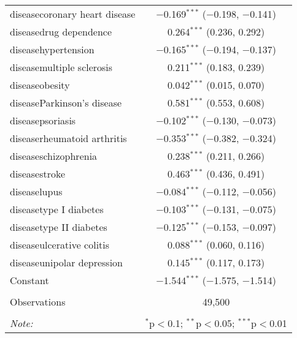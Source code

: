 \begin{table}[!htbp]
\begin{tabular}{@{\extracolsep{5pt}}lc}
  diseasecoronary heart disease & $-$0.169$^{***}$ ($-$0.198, $-$0.141) \\ 
  diseasedrug dependence & 0.264$^{***}$ (0.236, 0.292) \\ 
  diseasehypertension & $-$0.165$^{***}$ ($-$0.194, $-$0.137) \\ 
  diseasemultiple sclerosis & 0.211$^{***}$ (0.183, 0.239) \\ 
  diseaseobesity & 0.042$^{***}$ (0.015, 0.070) \\ 
  diseaseParkinson's disease & 0.581$^{***}$ (0.553, 0.608) \\ 
  diseasepsoriasis & $-$0.102$^{***}$ ($-$0.130, $-$0.073) \\ 
  diseaserheumatoid arthritis & $-$0.353$^{***}$ ($-$0.382, $-$0.324) \\ 
  diseaseschizophrenia & 0.238$^{***}$ (0.211, 0.266) \\ 
  diseasestroke & 0.463$^{***}$ (0.436, 0.491) \\ 
  diseaselupus & $-$0.084$^{***}$ ($-$0.112, $-$0.056) \\ 
  diseasetype I diabetes & $-$0.103$^{***}$ ($-$0.131, $-$0.075) \\ 
  diseasetype II diabetes & $-$0.125$^{***}$ ($-$0.153, $-$0.097) \\ 
  diseaseulcerative colitis & 0.088$^{***}$ (0.060, 0.116) \\ 
  diseaseunipolar depression & 0.145$^{***}$ (0.117, 0.173) \\ 
  Constant & $-$1.544$^{***}$ ($-$1.575, $-$1.514) \\ 
 \hline \\[-1.8ex] 
Observations & 49,500 \\ 
\hline 
\hline \\[-1.8ex] 
\textit{Note:}  & \multicolumn{1}{r}{$^{*}$p$<$0.1; $^{**}$p$<$0.05; $^{***}$p$<$0.01} \\ 
\end{tabular} 
\end{table} 
